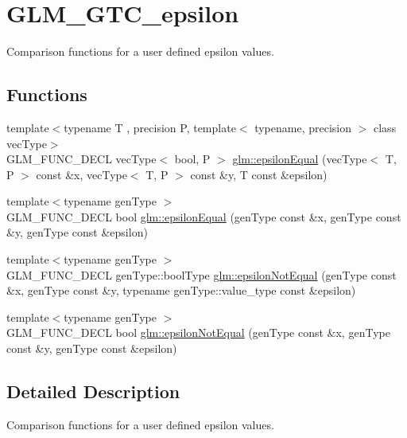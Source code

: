 \hypertarget{group__gtc__epsilon}{}\section{G\+L\+M\+\_\+\+G\+T\+C\+\_\+epsilon}
\label{group__gtc__epsilon}


Comparison functions for a user defined epsilon values.  


\subsection*{Functions}
\begin{DoxyCompactItemize}
\item 
{\footnotesize template$<$typename T , precision P, template$<$ typename, precision $>$ class vec\+Type$>$ }\\G\+L\+M\+\_\+\+F\+U\+N\+C\+\_\+\+D\+E\+CL vec\+Type$<$ bool, P $>$ \hyperlink{group__gtc__epsilon_gaca9443f217dc36587624247245522331}{glm\+::epsilon\+Equal} (vec\+Type$<$ T, P $>$ const \&x, vec\+Type$<$ T, P $>$ const \&y, T const \&epsilon)
\item 
{\footnotesize template$<$typename gen\+Type $>$ }\\G\+L\+M\+\_\+\+F\+U\+N\+C\+\_\+\+D\+E\+CL bool \hyperlink{group__gtc__epsilon_gaa7f227999ca09e7ca994e8b35aba47bb}{glm\+::epsilon\+Equal} (gen\+Type const \&x, gen\+Type const \&y, gen\+Type const \&epsilon)
\item 
{\footnotesize template$<$typename gen\+Type $>$ }\\G\+L\+M\+\_\+\+F\+U\+N\+C\+\_\+\+D\+E\+CL gen\+Type\+::bool\+Type \hyperlink{group__gtc__epsilon_ga14e2888a304654ade8a3996024e2739c}{glm\+::epsilon\+Not\+Equal} (gen\+Type const \&x, gen\+Type const \&y, typename gen\+Type\+::value\+\_\+type const \&epsilon)
\item 
{\footnotesize template$<$typename gen\+Type $>$ }\\G\+L\+M\+\_\+\+F\+U\+N\+C\+\_\+\+D\+E\+CL bool \hyperlink{group__gtc__epsilon_ga50a92103fb0cbd796908e1bf20c79aaf}{glm\+::epsilon\+Not\+Equal} (gen\+Type const \&x, gen\+Type const \&y, gen\+Type const \&epsilon)
\end{DoxyCompactItemize}


\subsection{Detailed Description}
Comparison functions for a user defined epsilon values. 

